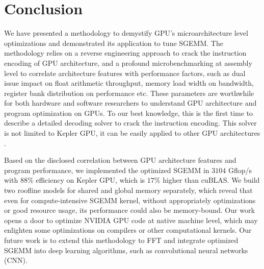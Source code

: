 \section{Conclusion}
\label{sec:conclusion}
We have presented a methodology to demystify GPU's microarchitecture level optimizations and demonstrated its 
application to tune SGEMM. The methodology relies on a reverse engineering approach to crack the instruction encoding 
of GPU architecture, and a profound microbenchmarking at assembly level to correlate architecture features with 
performance factors, such as dual issue impact on float arithmetic throughput, memory load width on bandwidth, register 
bank distribution on performance etc. These parameters are worthwhile for both hardware and software researchers to 
understand GPU architecture and program optimization on GPUs. To our best knowledge, this is the 
first time to describe a detailed decoding solver to crack the instruction encoding. 
This solver is not limited to Kepler GPU, it can be easily applied to other GPU architectures .

Based on the disclosed correlation between GPU architecture features and program performance, we implemented the optimized SGEMM in $3104$ Gflop/s with $88\%$ efficiency on Kepler GPU, which is $17\%$ higher than cuBLAS. 
We build two roofline models for shared and global memory separately, which reveal that even for compute-intensive SGEMM kernel, without appropriately optimizations or good resource usage, its performance could also be memory-bound.
Our work opens a door to optimize NVIDIA GPU code at native machine level, which may enlighten some optimizations on compilers or other computational kernels.
Our future work is to extend this methodology to FFT and integrate optimized SGEMM into deep learning algorithms, such as convolutional neural networks (CNN).


